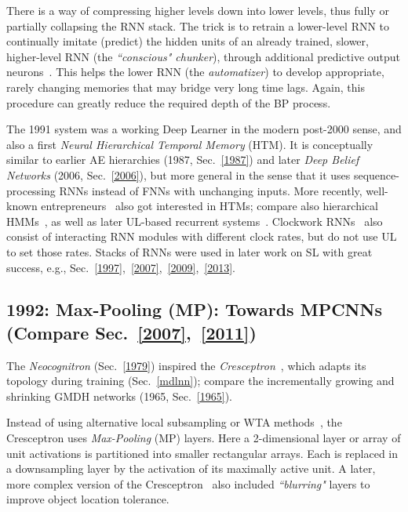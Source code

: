 \documentclass[letterpaper]{article}
\begin{document}
\begin{CJK*}{UTF8}{gbsn}
There is a way of compressing higher levels down into lower levels, thus 
fully or partially collapsing the RNN stack. The trick is to retrain a lower-level RNN to continually imitate (predict) the hidden units of an already trained, slower, higher-level RNN (the {\em``conscious" chunker}), through additional predictive output neurons~\citep{chunker91and92}. This helps the lower RNN (the {\em automatizer}) to develop appropriate, rarely changing memories that may bridge very long time lags. Again, this procedure can greatly reduce the required depth of the BP process. 

The 1991 system was a working Deep Learner in the 
modern post-2000 sense, and also a first  {\em Neural Hierarchical Temporal Memory} (HTM).
It is conceptually similar to earlier AE hierarchies (1987, Sec.~\ref{1987}) and
 later {\em Deep Belief Networks}  (2006, Sec.~\ref{2006}), but more general in the sense that it uses sequence-processing RNNs instead of FNNs with unchanging inputs. 
More recently, well-known entrepreneurs~\citep{hawkins2006,kurzweil2012} also got interested in 
HTMs; compare also hierarchical HMMs~\citep[e.g.,][]{tishby1998},
as well as later UL-based recurrent 
systems~\citep{Klapper:01,steil2007,maass2013,young2014}.
Clockwork RNNs~\citep{icml2014} also consist 
of interacting RNN modules with different clock rates,
but do not use UL to set those rates. 
Stacks of RNNs were used in later work on SL with great success, 
e.g., Sec.~\ref{1997},~\ref{2007},~\ref{2009},~\ref{2013}.





\subsection{1992: Max-Pooling (MP): Towards MPCNNs (Compare Sec.~\ref{2007},~\ref{2011})}
\label{1999}

The {\em Neocognitron} (Sec.~\ref{1979}) inspired the
{\em Cresceptron}~\citep{weng1992}, which adapts its topology during training (Sec.~\ref{mdlnn});
compare the incrementally growing and shrinking 
 GMDH networks (1965, Sec.~\ref{1965}).

Instead of using alternative local subsampling or WTA 
methods~\citep[e.g.,][]{fukushima:1980,Schmidhuber:89cs,Maass2000,Fukushima:2013},
the Cresceptron uses {\em Max-Pooling} (MP) layers. Here 
a 2-dimensional layer or array of unit activations is partitioned into 
smaller rectangular arrays. Each is replaced in a downsampling layer by the activation of its maximally active unit.
A later, more complex version of the Cresceptron~\citep{weng1997} also included {\em ``blurring"} layers
to improve object location tolerance. 



\end{CJK*}
\end{document}
